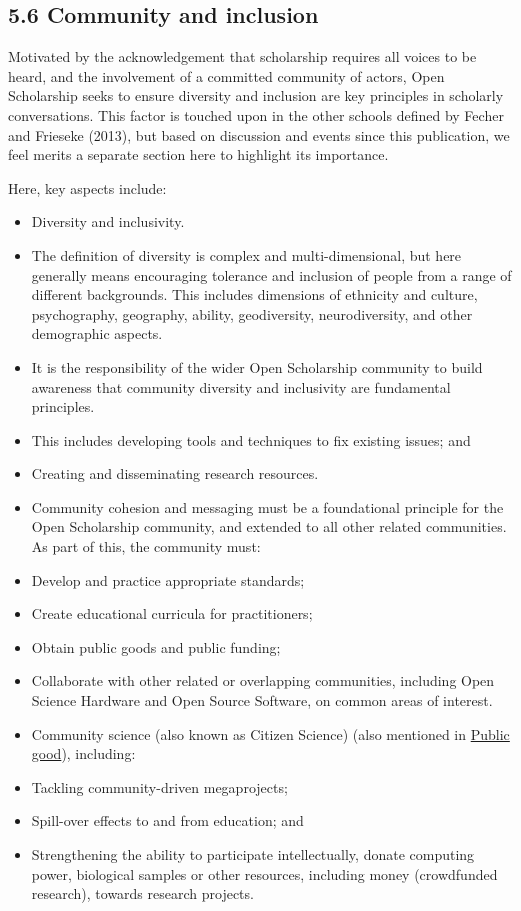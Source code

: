 \subsection{5.6 Community and inclusion }\label{community-and-inclusion}

Motivated by the acknowledgement that scholarship requires all voices to
be heard, and the involvement of a committed community of actors, Open
Scholarship seeks to ensure diversity and inclusion are key principles
in scholarly conversations. This factor is touched upon in the other
schools defined by Fecher and Frieseke (2013), but based on discussion
and events since this publication, we feel merits a separate section
here to highlight its importance.

Here, key aspects include:

\begin{itemize}
\item
  Diversity and inclusivity.
\item
  The definition of diversity is complex and multi-dimensional, but here
  generally means encouraging tolerance and inclusion of people from a
  range of different backgrounds. This includes dimensions of ethnicity
  and culture, psychography, geography, ability, geodiversity,
  neurodiversity, and other demographic aspects.
\item
  It is the responsibility of the wider Open Scholarship community to
  build awareness that community diversity and inclusivity are
  fundamental principles.
\item
  This includes developing tools and techniques to fix existing issues;
  and
\item
  Creating and disseminating research resources.
\item
  Community cohesion and messaging must be a foundational principle for
  the Open Scholarship community, and extended to all other related
  communities. As part of this, the community must:
\item
  Develop and practice appropriate standards;
\item
  Create educational curricula for practitioners;
\item
  Obtain public goods and public funding;
\item
  Collaborate with other related or overlapping communities, including
  Open Science Hardware and Open Source Software, on common areas of
  interest.
\item
  Community science (also known as Citizen Science) (also mentioned in
  \protect\hyperlink{Public}{Public good}), including:
\item
  Tackling community-driven megaprojects;
\item
  Spill-over effects to and from education; and
\item
  Strengthening the ability to participate intellectually, donate
  computing power, biological samples or other resources, including
  money (crowdfunded research), towards research projects.
\end{itemize}

